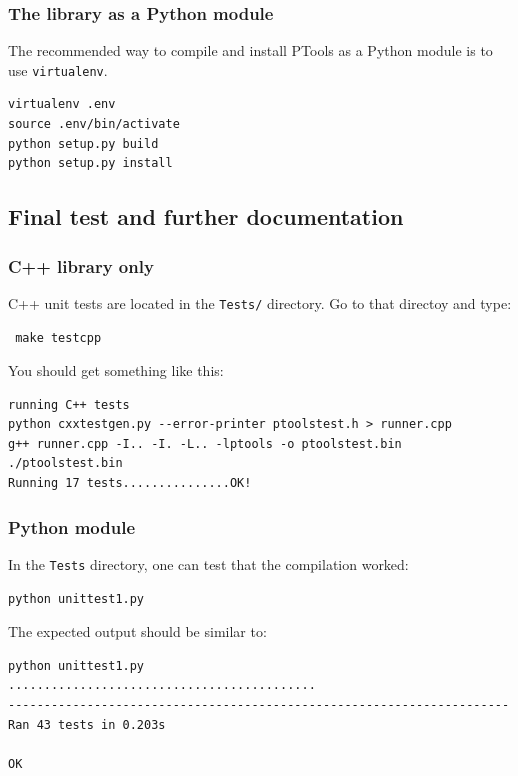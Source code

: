 \documentclass[12pt,a4paper]{article}
\begin{document}
\subsubsection{The library as a Python module}

The recommended way to compile and install PTools as a Python module is to use {\tt virtualenv}. 

\begin{verbatim}
virtualenv .env
source .env/bin/activate
python setup.py build
python setup.py install
\end{verbatim}





\subsection{Final test and further documentation}

\subsubsection{C++ library only}

C++ unit tests are located in the {\tt Tests/} directory. Go to that directoy and type:

\begin{verbatim}
 make testcpp
\end{verbatim}

You should get something like this:

\begin{verbatim}
running C++ tests
python cxxtestgen.py --error-printer ptoolstest.h > runner.cpp
g++ runner.cpp -I.. -I. -L.. -lptools -o ptoolstest.bin
./ptoolstest.bin
Running 17 tests...............OK!
\end{verbatim}


\subsubsection{Python module}

In the {\tt Tests} directory, one can test that the compilation worked:
\begin{verbatim}
python unittest1.py
\end{verbatim}

The expected output should be similar to:
\begin{verbatim}
python unittest1.py 
...........................................
----------------------------------------------------------------------
Ran 43 tests in 0.203s

OK
\end{verbatim}
\end{document}
